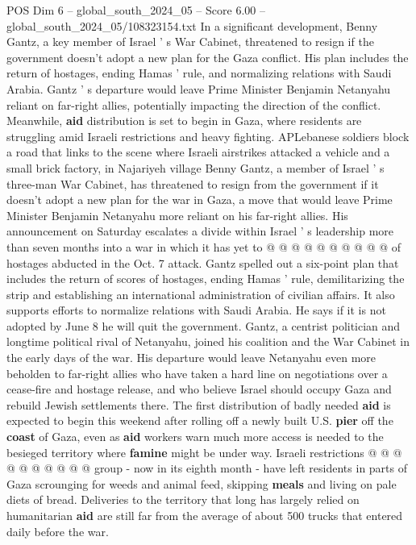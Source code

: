 \begin{textsample}{POS Dim 6 – global\_south\_2024\_05 – Score 6.00 – global\_south\_2024\_05/108323154.txt}  \label{ex:f6_pos_153}
In a significant development, Benny Gantz, a key member of Israel ' s War Cabinet, threatened to resign if the government doesn't adopt a new plan for the Gaza conflict.
His plan includes the return of hostages, ending Hamas ' rule, and normalizing relations with Saudi Arabia.
Gantz ' s departure would leave Prime Minister Benjamin Netanyahu reliant on far-right allies, potentially impacting the direction of the conflict.
Meanwhile, \textbf{aid} distribution is set to begin in Gaza, where residents are struggling amid Israeli restrictions and heavy fighting.
APLebanese soldiers block a road that links to the scene where Israeli airstrikes attacked a vehicle and a small brick factory, in Najariyeh village Benny Gantz, a member of Israel ' s three-man War Cabinet, has threatened to resign from the government if it doesn't adopt a new plan for the war in Gaza, a move that would leave Prime Minister Benjamin Netanyahu more reliant on his far-right allies.
His announcement on Saturday escalates a divide within Israel ' s leadership more than seven months into a war in which it has yet to @ @ @ @ @ @ @ @ @ @ of hostages abducted in the Oct. 7 attack.
Gantz spelled out a six-point plan that includes the return of scores of hostages, ending Hamas ' rule, demilitarizing the strip and establishing an international administration of civilian affairs.
It also supports efforts to normalize relations with Saudi Arabia.
He says if it is not adopted by June 8 he will quit the government.
Gantz, a centrist politician and longtime political rival of Netanyahu, joined his coalition and the War Cabinet in the early days of the war.
His departure would leave Netanyahu even more beholden to far-right allies who have taken a hard line on negotiations over a cease-fire and hostage release, and who believe Israel should occupy Gaza and rebuild Jewish settlements there.
The first distribution of badly needed \textbf{aid} is expected to begin this weekend after rolling off a newly built U.S. \textbf{pier} off the \textbf{coast} of Gaza, even as \textbf{aid} workers warn much more access is needed to the besieged territory where \textbf{famine} might be under way.
Israeli restrictions @ @ @ @ @ @ @ @ @ @ group - now in its eighth month - have left residents in parts of Gaza scrounging for weeds and animal feed, skipping \textbf{meals} and living on pale diets of bread.
Deliveries to the territory that long has largely relied on humanitarian \textbf{aid} are still far from the average of about 500 trucks that entered daily before the war.

\end{textsample}
